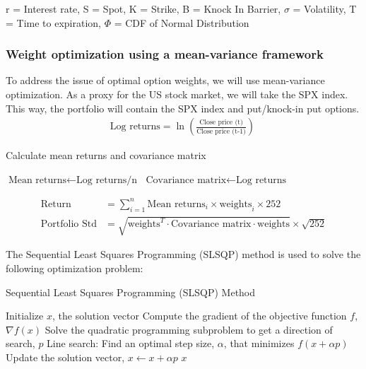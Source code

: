 \documentclass[12pt]{article}
\begin{document}
{{\qquad r = Interest rate, \quad S = Spot, \quad K = Strike, \quad B = Knock In Barrier, \quad $\sigma$  = Volatility, \quad T = Time to expiration, \quad $\Phi$ = CDF of Normal Distribution

\subsubsection{Weight optimization using a mean-variance framework}

\qquad To address the issue of optimal option weights, we will use mean-variance optimization. As a proxy for the US stock market, we will take the SPX index. This way, the portfolio will contain the SPX index and put/knock-in put options. 
\begin{align*}
\text{Log returns} = \ln\left(\frac{\text{Close price (t)}}{\text{Close price (t-1)}}\right) \
\end{align*}
\begin{algorithm}
\caption{Calculate mean returns and covariance matrix}
\begin{algorithmic}[1]
\State $\text{Mean returns} \gets \text{Log returns/n}$
\State $\text{Covariance matrix} \gets \text{Log returns}$
\end{algorithmic}
\end{algorithm}
\begin{align*}
\text{Return} &= \sum_{i=1}^{n} \text{Mean returns}_i \times \text{weights}_i \times 252 \\
\text{Portfolio Std} &= \sqrt{\text{weights}^T \cdot \text{Covariance matrix} \cdot \text{weights}} \times \sqrt{252}
\end{align*}


The Sequential Least Squares Programming (SLSQP) method is used to solve the following optimization problem:

\begin{algorithm}
\caption{Sequential Least Squares Programming (SLSQP) Method}
\begin{algorithmic}[2]
\State Initialize $x$, the solution vector
    \State Compute the gradient of the objective function $f$, $\nabla f(x)$
    \State Solve the quadratic programming subproblem to get a direction of search, $p$
    \State Line search: Find an optimal step size, $\alpha$, that minimizes $f(x + \alpha p)$
    \State Update the solution vector, $x \gets x + \alpha p$
\EndWhile
\State \Return $x$
\end{algorithmic}
\end{algorithm}

}}
\end{document}
